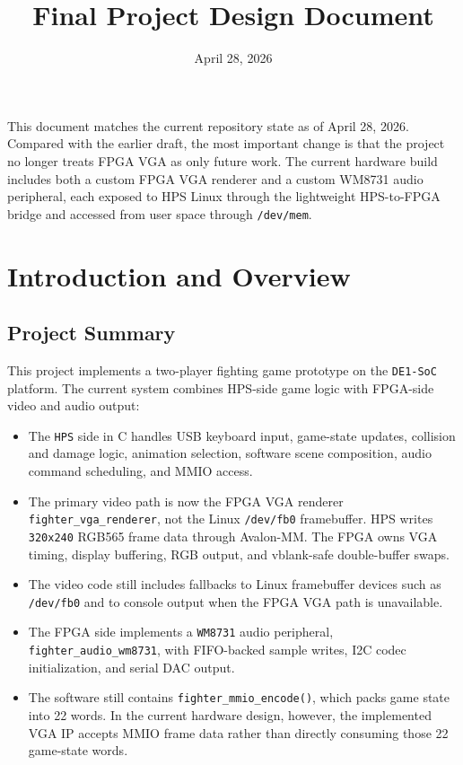 \documentclass[12pt,a4paper]{article}
\title{Final Project Design Document}
\author{}
\date{April 28, 2026}
\begin{document}
\maketitle

This document matches the current repository state as of April 28, 2026.
Compared with the earlier draft, the most important change is that the
project no longer treats FPGA VGA as only future work. The current hardware
build includes both a custom FPGA VGA renderer and a custom WM8731
audio peripheral, each exposed to HPS Linux through the lightweight
HPS-to-FPGA bridge and accessed from user space through \texttt{/dev/mem}.

\section{Introduction and Overview}

\subsection{Project Summary}

This project implements a two-player fighting game prototype on the
\texttt{DE1-SoC} platform. The current system combines HPS-side game logic
with FPGA-side video and audio output:

\begin{itemize}
  \item The \texttt{HPS} side in C handles USB keyboard input, game-state
  updates, collision and damage logic, animation selection, software scene
  composition, audio command scheduling, and MMIO access.
  \item The primary video path is now the FPGA VGA renderer
  \texttt{fighter\_vga\_renderer}, not the Linux \texttt{/dev/fb0}
  framebuffer. HPS writes \texttt{320x240} RGB565 frame data through
  Avalon-MM. The FPGA owns VGA timing, display buffering, RGB output, and
  vblank-safe double-buffer swaps.
  \item The video code still includes fallbacks to Linux framebuffer devices
  such as \texttt{/dev/fb0} and to console output when the FPGA VGA path is
  unavailable.
  \item The FPGA side implements a \texttt{WM8731} audio peripheral,
  \texttt{fighter\_audio\_wm8731}, with FIFO-backed sample writes, I2C codec
  initialization, and serial DAC output.
  \item The software still contains \texttt{fighter\_mmio\_encode()}, which
  packs game state into 22 words. In the current hardware design, however, the
  implemented VGA IP accepts MMIO frame data rather than directly consuming
  those 22 game-state words.
\end{itemize}
\end{document}

